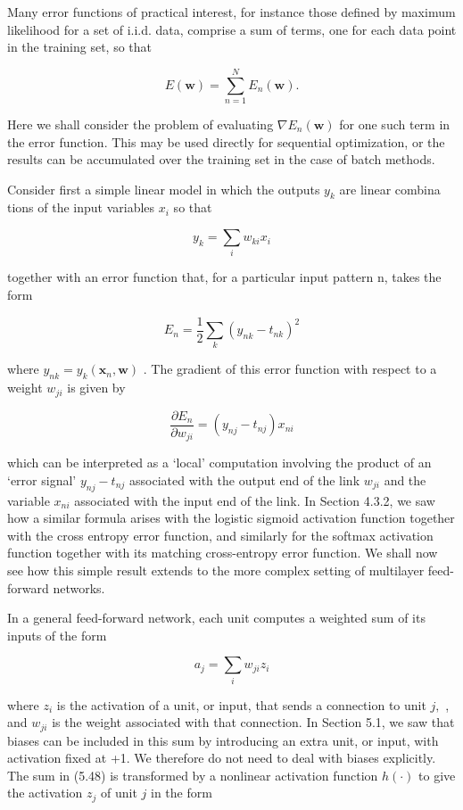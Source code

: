 \documentclass[
  10
]{article}
\begin{document}
Many error functions of practical interest, for instance those defined
by maximum likelihood for a set of i.i.d. data, comprise a sum of terms,
one for each data point in the training set, so that

\[
E (\mathbf {w}) = \sum_ {n = 1} ^ {N} E _ {n} (\mathbf {w}).\tag{5.44}
\]

Here we shall consider the problem of evaluating
\(\nabla E _ { n } ( \mathbf { w } )\) for one such term in the error
function. This may be used directly for sequential optimization, or the
results can be accumulated over the training set in the case of batch
methods.

Consider first a simple linear model in which the outputs \(y _ { k }\)
are linear combina tions of the input variables \(x _ { i }\) so that

\[
y _ {k} = \sum_ {i} w _ {k i} x _ {i}\tag{5.45}
\]

together with an error function that, for a particular input pattern n,
takes the form

\[
E _ {n} = \frac {1}{2} \sum_ {k} (y _ {n k} - t _ {n k}) ^ {2}\tag{5.46}
\]

where \(y _ { n k } = y _ { k } ( \mathbf x _ { n } , \mathbf w )\) .
The gradient of this error function with respect to a weight
\(w _ { j i }\) is given by

\[
\frac {\partial E _ {n}}{\partial w _ {j i}} = (y _ {n j} - t _ {n j}) x _ {n i}\tag{5.47}
\]

which can be interpreted as a `local' computation involving the product
of an `error signal' \(y _ { n j } - t _ { n j }\) associated with the
output end of the link \(w _ { j i }\) and the variable \(x _ { n i }\)
associated with the input end of the link. In Section 4.3.2, we saw how
a similar formula arises with the logistic sigmoid activation function
together with the cross entropy error function, and similarly for the
softmax activation function together with its matching cross-entropy
error function. We shall now see how this simple result extends to the
more complex setting of multilayer feed-forward networks.

In a general feed-forward network, each unit computes a weighted sum of
its inputs of the form

\[
a _ {j} = \sum_ {i} w _ {j i} z _ {i}\tag{5.48}
\]

where \(z _ { i }\) is the activation of a unit, or input, that sends a
connection to unit \(j ,\) , and \(w _ { j i }\) is the weight
associated with that connection. In Section 5.1, we saw that biases can
be included in this sum by introducing an extra unit, or input, with
activation fixed at +1. We therefore do not need to deal with biases
explicitly. The sum in (5.48) is transformed by a nonlinear activation
function \(h ( \cdot )\) to give the activation \(z _ { j }\) of unit
\(j\) in the form
\end{document}
